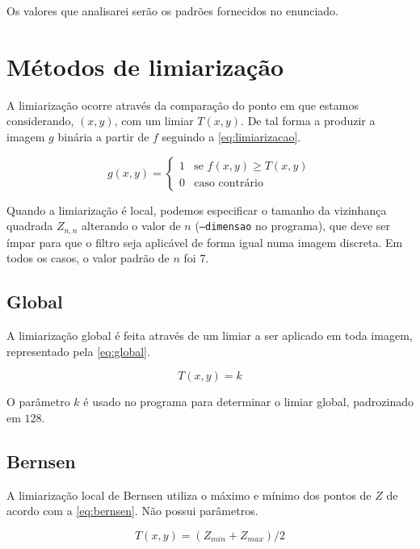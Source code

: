 \documentclass[brazilian,a4paper,twocolumn]{article}
\begin{document}
    Os valores que analisarei serão os padrões fornecidos no enunciado.


\section{Métodos de limiarização}

    A limiarização ocorre através da comparação do ponto em que estamos considerando, $(x, y)$, com um limiar $T(x, y)$. De tal forma a produzir a imagem $g$ binária a partir de $f$ seguindo a \cref{eq:limiarizacao}.

    \begin{equation}
    \label{eq:limiarizacao}
        g(x, y) =
        \begin{cases}
            1       & \text{se $f(x, y) \geq T(x, y)$} \\
            0       & \text{caso contrário}
        \end{cases}
    \end{equation}

    Quando a limiarização é local, podemos especificar o tamanho da vizinhança quadrada $Z_{n,n}$ alterando o valor de $n$ (\texttt{--dimensao} no programa), que deve ser ímpar para que o filtro seja aplicável de forma igual numa imagem discreta. Em todos os casos, o valor padrão de $n$ foi $7$.

    \subsection{Global}

        A limiarização global é feita através de um limiar a ser aplicado em toda imagem, representado pela \cref{eq:global}.

        \begin{equation}
        \label{eq:global}
            T(x, y) = k
        \end{equation}

        O parâmetro $k$ é usado no programa para determinar o limiar global, padrozinado em $128$.

    \subsection{Bernsen}

        A limiarização local de Bernsen utiliza o máximo e mínimo dos pontos de $Z$ de acordo com a \cref{eq:bernsen}. Não possui parâmetros.

        \begin{equation}
        \label{eq:bernsen}
            T(x, y) = (Z_{min} + Z_{max}) / 2
        \end{equation}
\end{document}
